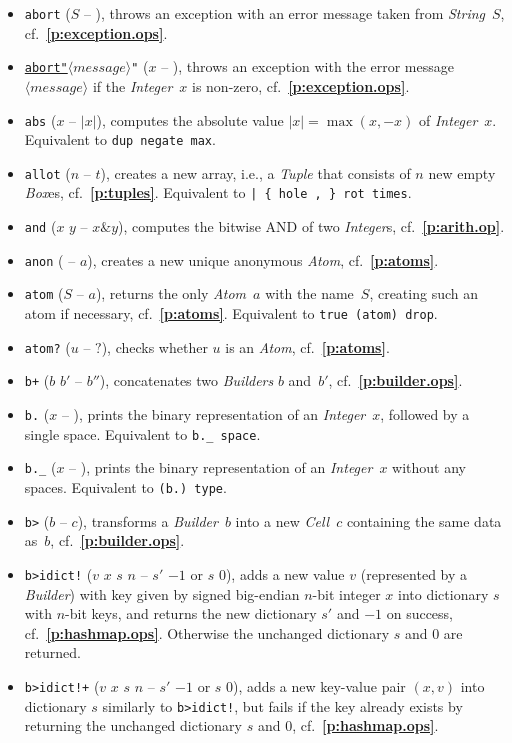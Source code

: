 \documentclass[12pt,oneside]{article}
\def\refpoint#1{{\rm\textbf{\ref{#1}}}}
\let\ptref=\refpoint
\begin{document}
\begin{itemize}
\item {\tt abort} ($S$ -- ), throws an exception with an error message taken from {\em String\/}~$S$, cf.~\ptref{p:exception.ops}.
\item {\tt \underline{abort"}$\langle\textit{message}\rangle$"} ($x$ -- ), throws an exception with the error message $\langle\textit{message}\rangle$ if the {\em Integer\/}~$x$ is non-zero, cf.~\ptref{p:exception.ops}.
\item {\tt abs} ($x$ -- $|x|$), computes the absolute value $|x|=\max(x,-x)$ of {\em Integer\/}~$x$. Equivalent to {\tt dup negate max}.
\item {\tt allot} ($n$ -- $t$), creates a new array, i.e., a {\em Tuple\/} that consists of $n$ new empty {\em Box\/}es, cf.~\ptref{p:tuples}. Equivalent to {\tt | \{ hole , \} rot times}.
\item {\tt and} ($x$ $y$ -- $x\& y$), computes the bitwise AND of two {\em Integer\/}s, cf.~\ptref{p:arith.op}.
\item {\tt anon} ( -- $a$), creates a new unique anonymous {\em Atom}, cf.~\ptref{p:atoms}.
\item {\tt atom} ($S$ -- $a$), returns the only {\em Atom\/}~$a$ with the name~$S$, creating such an atom if necessary, cf.~\ptref{p:atoms}. Equivalent to {\tt true (atom) drop}.
\item {\tt atom?} ($u$ -- $?$), checks whether $u$ is an {\em Atom}, cf.~\ptref{p:atoms}.
\item {\tt b+} ($b$ $b'$ -- $b''$), concatenates two {\em Builders\/} $b$ and~$b'$, cf.~\ptref{p:builder.ops}.
\item {\tt b.} ($x$ -- ), prints the binary representation of an {\em Integer\/}~$x$, followed by a single space. Equivalent to {\tt b.\_ space}.
\item {\tt b.\_} ($x$ -- ), prints the binary representation of an {\em Integer\/}~$x$ without any spaces. Equivalent to {\tt (b.)~type}.
\item {\tt b>} ($b$ -- $c$), transforms a {\em Builder\/}~$b$ into a new {\em Cell\/}~$c$ containing the same data as~$b$, cf.~\ptref{p:builder.ops}.
\item {\tt b>idict!} ($v$ $x$ $s$ $n$ -- $s'$ $-1$ or $s$ $0$), adds a new value $v$ (represented by a {\em Builder}) with key given by signed big-endian $n$-bit integer $x$ into dictionary $s$ with $n$-bit keys, and returns the new dictionary $s'$ and $-1$ on success, cf.~\ptref{p:hashmap.ops}. Otherwise the unchanged dictionary $s$ and $0$ are returned.
\item {\tt b>idict!+} ($v$ $x$ $s$ $n$ -- $s'$ $-1$ or $s$ $0$), adds a new key-value pair $(x,v)$ into dictionary $s$ similarly to {\tt b>idict!}, but fails if the key already exists by returning the unchanged dictionary $s$ and $0$, cf.~\ptref{p:hashmap.ops}.

\end{itemize}
\end{document}
